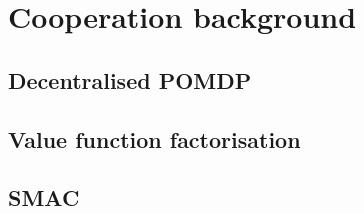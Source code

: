 \chapter{Cooperation background}\label{ch:cooperation}

\section{Decentralised POMDP}
\section{Value function factorisation}
\section{SMAC}

